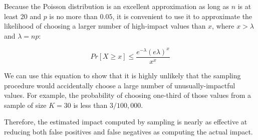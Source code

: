 Because the Poisson distribution is an excellent approximation as long
as $n$ is at least 20 and $p$ is no more than $0.05$, it is convenient
to use it to approximate the likelihood of choosing a larger number of
high-impact values than $x$, where $x > \lambda$ and $\lambda = np$:

\begin{equation}
Pr[X \geq x] \leq \frac{e^{-\lambda}(e \lambda)^x}{x^x}
\end{equation}

We can use this equation to show that it is highly unlikely that the
sampling procedure would accidentally choose a large number of
unusually-impactful values. For example, the probability of choosing
one-third of those values from a sample of size $K = 30$ is less than
$3/100,000$.

Therefore, the estimated impact computed by sampling is
nearly as effective at reducing both false positives and false
negatives as computing the actual impact.



